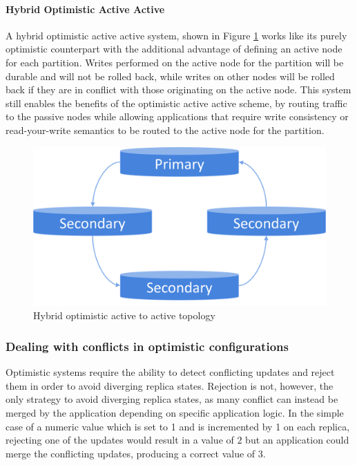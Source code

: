 \paragraph{Hybrid Optimistic Active Active}
A hybrid optimistic active active system, shown in Figure \ref{fig:hybrid-optimistic-active-active} works like its purely optimistic counterpart with the additional advantage of defining an active node for each partition.
Writes performed on the active node for the partition will be durable and will not be rolled back, while writes on other nodes will be rolled back if they are in conflict with those originating on the active node.
This system still enables the benefits of the optimistic active active scheme, by routing traffic to the passive nodes while allowing applications that require write consistency or read-your-write semantics to be routed to the active node for the partition.

\begin{figure}[h]
\caption{Hybrid optimistic active to active topology}
\label{fig:hybrid-optimistic-active-active}
\centering
\includegraphics[width=1.0\textwidth]{images/hybrid-optimistic-active-active.png}
\end{figure}


\subsubsection{Dealing with conflicts in optimistic configurations}
Optimistic systems require the ability to detect conflicting updates and reject them in order to avoid diverging replica states.
Rejection is not, however, the only strategy to avoid diverging replica states, as many conflict can instead be merged by the application depending on specific application logic.
In the simple case of a numeric value which is set to 1 and is incremented by 1 on each replica, rejecting one of the updates would result in a value of $2$ but an application could merge the conflicting updates, producing a correct value of 3.

